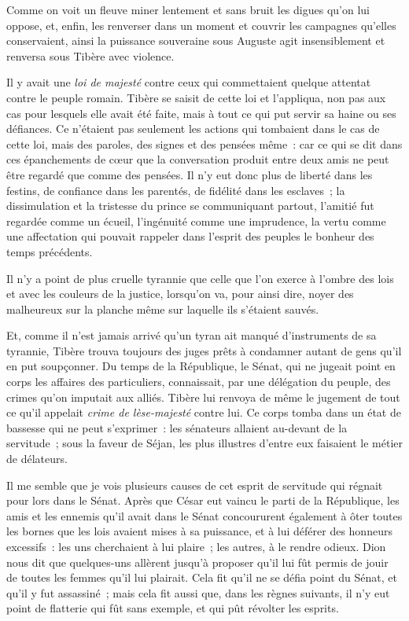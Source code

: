 \documentclass[french,twoside]{book} %
\newcommand\chaptercont{} %
\begin{document}
\chaptercont
\noindent Comme on voit un fleuve miner lentement et sans bruit les digues qu’on lui oppose, et, enfin, les renverser dans un moment et couvrir les campagnes qu’elles conservaient, ainsi la puissance souveraine sous Auguste agit insensiblement et renversa sous Tibère avec violence.\par
Il y avait une {\itshape loi de majesté} contre ceux qui commettaient quelque attentat contre le peuple romain. Tibère se saisit de cette loi et l’appliqua, non pas aux cas pour lesquels elle avait été faite, mais à tout ce qui put servir sa haine ou ses défiances. Ce n’étaient pas seulement les actions qui tombaient dans le cas de cette loi, mais des paroles, des signes et des pensées même : car ce qui se dit dans ces épanchements de cœur que la conversation produit entre deux amis ne peut être regardé que comme des pensées. Il n’y eut donc plus de liberté dans les festins, de confiance dans les parentés, de fidélité dans les esclaves ; la dissimulation et la tristesse du prince se communiquant partout, l’amitié fut regardée comme un écueil, l’ingénuité comme une imprudence, la vertu comme une affectation qui pouvait rappeler dans l’esprit des peuples le bonheur des temps précédents.\par
Il n’y a point de plus cruelle tyrannie que celle que l’on exerce à l’ombre des lois et avec les couleurs de la justice, lorsqu’on va, pour ainsi dire, noyer des malheureux sur la planche même sur laquelle ils s’étaient sauvés.\par
Et, comme il n’est jamais arrivé qu’un tyran ait manqué d’instruments de sa tyrannie, Tibère trouva toujours des juges prêts à condamner autant de gens qu’il en put soupçonner. Du temps de la République, le Sénat, qui ne jugeait point en corps les affaires des particuliers, connaissait, par une délégation du peuple, des crimes qu’on imputait aux alliés. Tibère lui renvoya de même le jugement de tout ce qu’il appelait {\itshape crime de lèse-majesté} contre lui. Ce corps tomba dans un état de bassesse qui ne peut s’exprimer : les sénateurs allaient au-devant de la servitude ; sous la faveur de Séjan, les plus illustres d’entre eux faisaient le métier de délateurs.\par
Il me semble que je vois plusieurs causes de cet esprit de servitude qui régnait pour lors dans le Sénat. Après que César eut vaincu le parti de la République, les amis et les ennemis qu’il avait dans le Sénat concoururent également à ôter toutes les bornes que les lois avaient mises à sa puissance, et à lui déférer des honneurs excessifs : les uns cherchaient à lui plaire ; les autres, à le rendre odieux. Dion nous dit que quelques-uns allèrent jusqu’à proposer qu’il lui fût permis de jouir de toutes les femmes qu’il lui plairait. Cela fit qu’il ne se défia point du Sénat, et qu’il y fut assassiné ; mais cela fit aussi que, dans les règnes suivants, il n’y eut point de flatterie qui fût sans exemple, et qui pût révolter les esprits.\par
\end{document}
